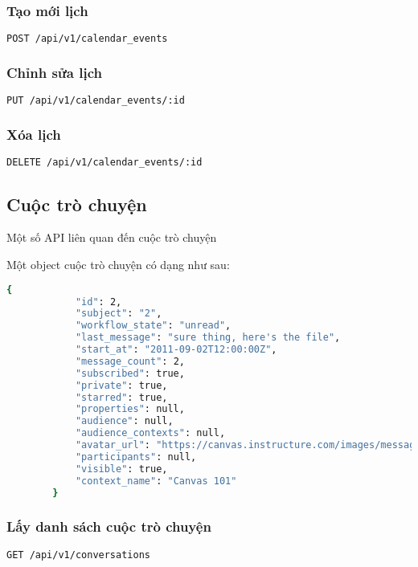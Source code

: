 \documentclass[../Thesis.tex]{subfiles}
\begin{document}
        \subsubsection{Tạo mới lịch}
        \begin{lstlisting}[language=bash]
            POST /api/v1/calendar_events
        \end{lstlisting}

        \subsubsection{Chỉnh sửa lịch}
        \begin{lstlisting}[language=bash]
            PUT /api/v1/calendar_events/:id
        \end{lstlisting}

        \subsubsection{Xóa lịch}
        \begin{lstlisting}[language=bash]
            DELETE /api/v1/calendar_events/:id
        \end{lstlisting}

    \subsection{Cuộc trò chuyện}

        Một số API liên quan đến cuộc trò chuyện

        Một object cuộc trò chuyện có dạng như sau:

        \begin{lstlisting}[language=bash]
            {
            "id": 2,
            "subject": "2",
            "workflow_state": "unread",
            "last_message": "sure thing, here's the file",
            "start_at": "2011-09-02T12:00:00Z",
            "message_count": 2,
            "subscribed": true,
            "private": true,
            "starred": true,
            "properties": null,
            "audience": null,
            "audience_contexts": null,
            "avatar_url": "https://canvas.instructure.com/images/messages/avatar-group-50.png",
            "participants": null,
            "visible": true,
            "context_name": "Canvas 101"
        }

        \end{lstlisting}

        \subsubsection{Lấy danh sách cuộc trò chuyện}
        \begin{lstlisting}[language=bash]
            GET /api/v1/conversations
        \end{lstlisting}
\end{document}
